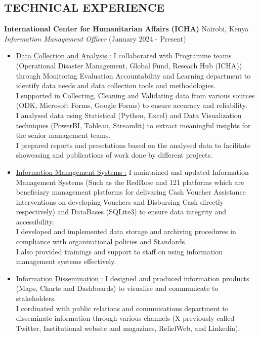\documentclass[line,margin,10pt]{res}
\begin{document}
\begin{resume}
\section{TECHNICAL EXPERIENCE}

\textbf{International Center for Humanitarian Affairs (ICHA)} \hfill Nairobi, Kenya\\
{\sl Information Management Officer} \hfill (January 2024 - Present)
\begin{itemize} \itemsep -2pt
    \item \underline{Data Collection and Analysis :}
    I collaborated with Programme teams (Operational Disaster Management, Global Fund, Reseach Hub (ICHA)) through Monitoring Evaluation Accountability and Learning department to identify data needs and data collection tools and methodologies.\\
    I supported in Collecting, Cleaning and Validating data from various sources (ODK, Microsoft Forms, Google Forms) to ensure accuracy and reliability.\\
    I analysed data using Statistical (Python, Excel) and Data Visualization techniques (PowerBI, Tableau, Streamlit) to extract meaningful insights for the senior management teams.\\
    I prepared reports and presetations based on the analysed data to facilitate showcasing and publications of work done by different projects.
    \item \underline{Information Management Systems :}
    I maintained and updated Information Management Systems (Such as the RedRose and 121 platforms which are beneficiary management platforms for delivaring Cash Voucher Assistance interventions on developing Vouchers and Disbursing Cash directly respectively) and DataBases (SQLite3) to ensure data integrity and accessibility.\\
    I developed and implemented data storage and archiving procedures in compliance with organizational policies and Standards.\\
    I also provided trainings and support to staff on using information management systems effectively.
    \item \underline{Information Dissemination :}
    I designed and produced information products (Maps, Charts and Dashboards) to visualise and communicate to stakeholders.\\
    I cordinated with public relations and commuications department to disseminate information through various channels (X previously called Twitter, Institutional website and magazines, ReliefWeb, and Linkedin).

\end{itemize}
\end{resume}
\end{document}
